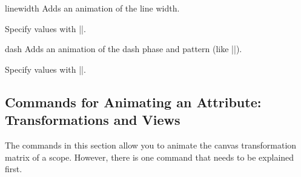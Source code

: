 \begin{sysanimateattribute}{linewidth}
    Adds an animation of the line width.

    Specify values with |\pgfsysanimvaldimension|.
\begin{codeexample}[imagesource={standalone/pgfmanual-en-pgfsys-animations-animation-11.svg}]
\end{codeexample}
\end{sysanimateattribute}

\begin{sysanimateattribute}{dash}
    Adds an animation of the dash phase and pattern (like |\pgfsys@setdash|).

    Specify values with |\pgfsysanimvaldash|.
\begin{codeexample}[imagesource={standalone/pgfmanual-en-pgfsys-animations-animation-12.svg}]
\end{codeexample}
\begin{codeexample}[imagesource={standalone/pgfmanual-en-pgfsys-animations-animation-13.svg}]
\end{codeexample}
\begin{codeexample}[imagesource={standalone/pgfmanual-en-pgfsys-animations-animation-14.svg}]
\end{codeexample}
\end{sysanimateattribute}


\subsection{Commands for Animating an Attribute: Transformations  and Views}

The commands in this section allow you to animate the canvas transformation
matrix of a scope. However, there is one command that needs to be explained
first.

